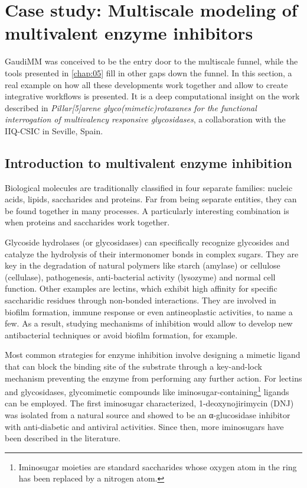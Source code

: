 
\section[Multiscale modeling of multivalent enzyme inhibitors]{Case study: Multiscale modeling of multivalent enzyme inhibitors}
\label{section:rotaxane}
GaudiMM was conceived to be the entry door to the multiscale funnel, while the tools presented in \autoref{chap:05} fill in other gaps down the funnel. In this section, a real example on how all these developments work together and allow to create integrative workflows is presented. It is a deep computational insight on the work described in \textit{Pillar[5]arene glyco(mimetic)rotaxanes for the functional interrogation of multivalency responsive glycosidases},\cite{rotaxane} a collaboration with the IIQ-CSIC in Seville, Spain.

\subsection{Introduction to multivalent enzyme inhibition}
Biological molecules are traditionally classified in four separate families: nucleic acids, lipids, saccharides and proteins. Far from being separate entities, they can be found together in many processes. A particularly interesting combination is when proteins and saccharides work together.

Glycoside hydrolases (or glycosidases) can specifically recognize glycosides and catalyze the hydrolysis of their intermonomer bonds in complex sugars.  They are key in the degradation of natural polymers like starch (amylase) or cellulose (cellulase), pathogenesis, anti-bacterial activity (lysozyme) and normal cell function. Other examples are lectins, which exhibit high affinity for specific saccharidic residues through non-bonded interactions. They are involved in biofilm formation,\cite{tielker2005pseudomonas} immune response\cite{turner1996mannose} or even antineoplastic activities,\cite{adwan2014} to name a few. As a result, studying mechanisms of inhibition would allow to develop new antibacterial techniques or avoid biofilm formation, for example.

Most common strategies for enzyme inhibition involve designing a mimetic ligand that can block the binding site of the substrate through a key-and-lock mechanism preventing the enzyme from performing any further action. For lectins and glycosidases, glycomimetic compounds like iminosugar-containing\footnote{Iminosugar moieties are standard saccharides whose oxygen atom in the ring has been replaced by a nitrogen atom.} ligands can be employed.  The first iminosugar characterized, 1-deoxynojirimycin (DNJ) was isolated from a natural source and showed to be an α-glucosidase inhibitor with anti-diabetic and antiviral activities. Since then, more iminosugars have been described in the literature.

